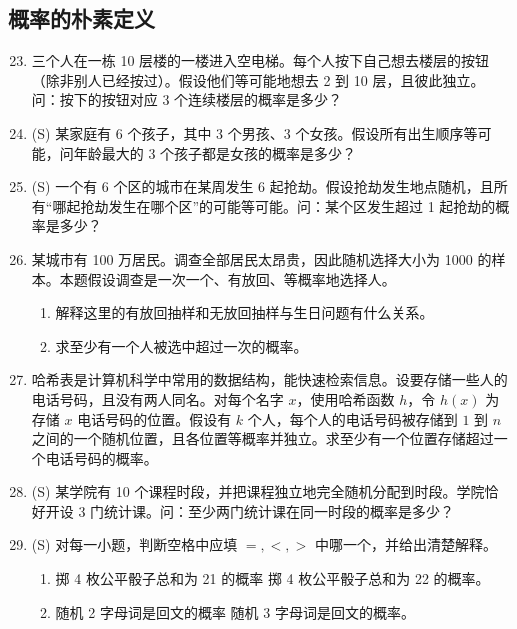 \documentclass[UTF8, 12pt, fontset=fandol, oneside]{ctexart}
\begin{document}
\subsection*{概率的朴素定义}

\begin{enumerate}
  \setcounter{enumi}{22}
  \item 三个人在一栋 10 层楼的一楼进入空电梯。每个人按下自己想去楼层的按钮（除非别人已经按过）。假设他们等可能地想去 2 到 10 层，且彼此独立。问：按下的按钮对应 3 个连续楼层的概率是多少？

  \item (S) 某家庭有 6 个孩子，其中 3 个男孩、3 个女孩。假设所有出生顺序等可能，问年龄最大的 3 个孩子都是女孩的概率是多少？

  \item (S) 一个有 6 个区的城市在某周发生 6 起抢劫。假设抢劫发生地点随机，且所有“哪起抢劫发生在哪个区”的可能等可能。问：某个区发生超过 1 起抢劫的概率是多少？

  \item 某城市有 100 万居民。调查全部居民太昂贵，因此随机选择大小为 1000 的样本。本题假设调查是一次一个、有放回、等概率地选择人。
  \begin{enumerate}
    \item 解释这里的有放回抽样和无放回抽样与生日问题有什么关系。
    \item 求至少有一个人被选中超过一次的概率。
  \end{enumerate}

  \item 哈希表是计算机科学中常用的数据结构，能快速检索信息。设要存储一些人的电话号码，且没有两人同名。对每个名字 $x$，使用哈希函数 $h$，令 $h(x)$ 为存储 $x$ 电话号码的位置。假设有 $k$ 个人，每个人的电话号码被存储到 $1$ 到 $n$ 之间的一个随机位置，且各位置等概率并独立。求至少有一个位置存储超过一个电话号码的概率。

  \item (S) 某学院有 10 个课程时段，并把课程独立地完全随机分配到时段。学院恰好开设 3 门统计课。问：至少两门统计课在同一时段的概率是多少？

  \item (S) 对每一小题，判断空格中应填 $=,<,>$ 中哪一个，并给出清楚解释。
  \begin{enumerate}
    \item 掷 4 枚公平骰子总和为 21 的概率 \underline{\hspace{1cm}} 掷 4 枚公平骰子总和为 22 的概率。
    \item 随机 2 字母词是回文的概率 \underline{\hspace{1cm}} 随机 3 字母词是回文的概率。
  \end{enumerate}


\end{enumerate}
\end{document}
